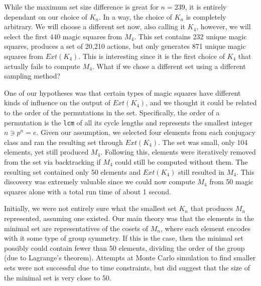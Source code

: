 \documentclass[12pt]{report}
\begin{document}
\par While the maximum set size difference is great for $n=239$, it is entirely dependant on our
choice of $K_n$. In a way, the choice of $K_n$ is completely arbitrary. We will choose a different
set now, also calling it $K_4$, however, we will select the first 440 magic squares from $M_4$.
This set contains 232 unique magic squares, produces a set of 20,210 actions, but only generates
871 unique magic squares from $Ext\left(K_4\right)$. This is interesting since it is the first
choice of $K_4$ that actually fails to compute $M_4$. What if we chose a different set using a
different sampling method?

\par One of our hypotheses was that certain types of magic squares have different kinds of
influence on the output of $Ext\left(K_4\right)$, and we thought it could be related to the order
of the permutations in the set. Specifically, the order of a permutation is the \texttt{lcm} of all
its cycle lengths and represents the smallest integer $n \ni p^n = e$. Given our assumption, we
selected four elements from each conjugacy class and ran the resulting set through
$Ext\left(K_4\right)$. The set was small, only 104 elements, yet still produced $M_4$. Following
this, elements were iteratively removed from the set via backtracking if $M_4$
could still be computed without them. The resulting set contained only 50 elements and
$Ext\left(K_4\right)$ still resulted in $M_4$. This discovery was extremely valuable since we could
now compute $M_4$ from 50 magic squares alone with a total run time of about 1 second.

\par Initially, we were not entirely sure what the smallest set $K_n$ that produces $M_n$
represented, assuming one existed. Our main theory was that the elements in the minimal set are
representatives of the cosets of $M_n$, where each element encodes with it some type of group
symmetry. If this is the case, then the minimal set possibly could contain fewer than 50 elements,
dividing the order of the group (due to Lagrange's theorem). Attempts at Monte Carlo simulation to
find smaller sets were not successful due to time constraints, but did suggest that the size of the
minimal set is very close to 50.
\end{document}
